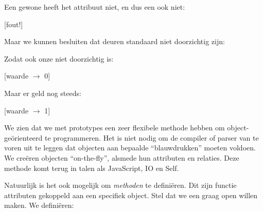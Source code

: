 \begin{codelines}
\end{codelines}

Een gewone  heeft het attribuut  niet, en dus een  ook niet:

\begin{codelines}
  [fout!]
\end{codelines}

Maar we kunnen besluiten dat deuren standaard niet doorzichtig zijn:

\begin{codelines}
\end{codelines}

Zodat ook onze  niet doorzichtig is:

\begin{codelines}
  [waarde $\to$ 0]
\end{codelines}

Maar er geld nog steeds:

\begin{codelines}
  [waarde $\to$ 1]
\end{codelines}

We zien dat we met prototypes een zeer flexibele methode hebben om object-geörienteerd te programmeren. Het is niet nodig om de compiler of parser van te voren uit te leggen dat objecten aan bepaalde ``blauwdrukken'' moeten voldoen. We creëren objecten ``on-the-fly'', alsmede hun attributen en relaties. Deze methode komt terug in talen als JavaScript, IO en Self.

Natuurlijk is het ook mogelijk om \emph{methoden} te definiëren. Dit zijn functie attributen gekoppeld aan een specifiek object. Stel dat we een  graag open willen maken. We definiëren:

\begin{codelines}
  \codeLine{\IN \ELSE}
\end{codelines}

